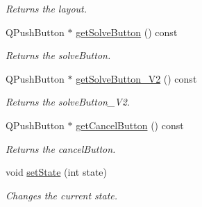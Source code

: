 \begin{DoxyCompactItemize}
\begin{DoxyCompactList}\small\item\em Returns the layout. \end{DoxyCompactList}\item 
\mbox{\label{classSGGameHandler_a8300ed57be8ed34010ef1f7cf0557067}} 
Q\+Push\+Button $\ast$ \hyperlink{classSGGameHandler_a8300ed57be8ed34010ef1f7cf0557067}{get\+Solve\+Button} () const
\begin{DoxyCompactList}\small\item\em Returns the solve\+Button. \end{DoxyCompactList}\item 
\mbox{\label{classSGGameHandler_af5af785b3b10ad782708fe8cfe93e371}} 
Q\+Push\+Button $\ast$ \hyperlink{classSGGameHandler_af5af785b3b10ad782708fe8cfe93e371}{get\+Solve\+Button\+\_\+\+V2} () const
\begin{DoxyCompactList}\small\item\em Returns the solve\+Button\+\_\+\+V2. \end{DoxyCompactList}\item 
\mbox{\label{classSGGameHandler_a960e25dee1b13f27d4eb903f392e61e5}} 
Q\+Push\+Button $\ast$ \hyperlink{classSGGameHandler_a960e25dee1b13f27d4eb903f392e61e5}{get\+Cancel\+Button} () const
\begin{DoxyCompactList}\small\item\em Returns the cancel\+Button. \end{DoxyCompactList}\item 
void \hyperlink{classSGGameHandler_a70b3147a78c94d3b7884b096a3a3a352}{set\+State} (int state)
\begin{DoxyCompactList}\small\item\em Changes the current state. \end{DoxyCompactList}\end{DoxyCompactItemize}
